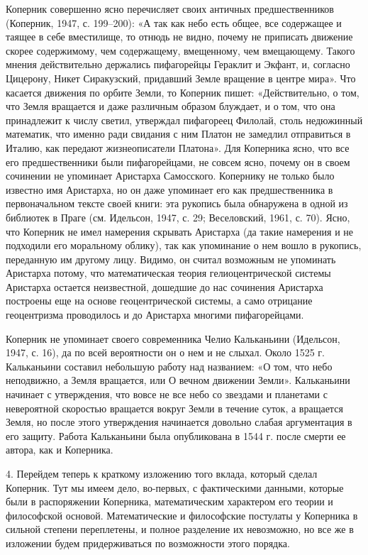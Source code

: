 Коперник совершенно  ясно перечисляет своих  античных предшественников
(Коперник,  1947,  с. 199--200):  «А  так  как  небо есть  общее,  все
содержащее и таящее  в себе вместилище, то отнюдь не  видно, почему не
приписать  движение скорее  содержимому, чем  содержащему, вмещенному,
чем  вмещающему.  Такого  мнения действительно  держались  пифагорейцы
Гераклит и Экфант, и,  согласно Цицерону, Никет Сиракузский, придавший
Земле вращение в центре мира».  Что касается движения по орбите Земли,
то Коперник пишет:  «Действительно, о том, что Земля  вращается и даже
различным  образом блуждает,  и о  том,  что она  принадлежит к  числу
светил, утверждал пифагореец Филолай,  столь недюжинный математик, что
именно ради  свидания с ним  Платон не замедлил отправиться  в Италию,
как передают жизнеописатели Платона». Для  Коперника ясно, что все его
предшественники  были  пифагорейцами,  не  совсем ясно,  почему  он  в
своем  сочинении  не  упоминает  Аристарха  Самосского.  Копернику  не
только  было известно  имя Аристарха,  но  он даже  упоминает его  как
предшественника в первоначальном тексте своей книги: эта рукопись была
обнаружена в  одной из библиотек в  Праге (см. Идельсон, 1947,  с. 29;
Веселовский,  1961,  с. 70).  Ясно,  что  Коперник не  имел  намерения
скрывать Аристарха (да  такие намерения и не  подходили его моральному
облику),  так как  упоминание о  нем вошло  в рукопись,  переданную им
другому  лицу.  Видимо, он  считал  возможным  не упоминать  Аристарха
потому, что математическая  теория гелиоцентрической системы Аристарха
остается неизвестной,  дошедшие до  нас сочинения  Аристарха построены
еще на  основе геоцентрической системы, а  само отрицание геоцентризма
проводилось и до Аристарха многими пифагорейцами.

Коперник не упоминает своего современника Челио Кальканьини (Идельсон,
1947, с. 16), да по всей вероятности  он о нем и не слыхал. Около 1525
г. Кальканьини  составил небольшую работу  над названием: «О  том, что
небо  неподвижно, а  Земля вращается,  или О  вечном движении  Земли».
Кальканьини начинает с утверждения, что  вовсе не все небо со звездами
и планетами с  невероятной скоростью вращается вокруг  Земли в течение
суток,  а  вращается  Земля,  но после  этого  утверждения  начинается
довольно  слабая аргументация  в его  защиту. Работа  Кальканьини была
опубликована в 1544 г. после смерти ее автора, как и Коперника.

4. Перейдем  теперь к краткому  изложению того вклада,  который сделал
Коперник.  Тут  мы  имеем  дело, во-первых,  с  фактическими  данными,
которые были  в распоряжении Коперника, математическим  характером его
теории и философской основой. Математические и философские постулаты у
Коперника  в  сильной  степени  переплетены, и  полное  разделение  их
невозможно, но все же в  изложении будем придерживаться по возможности
этого порядка.


